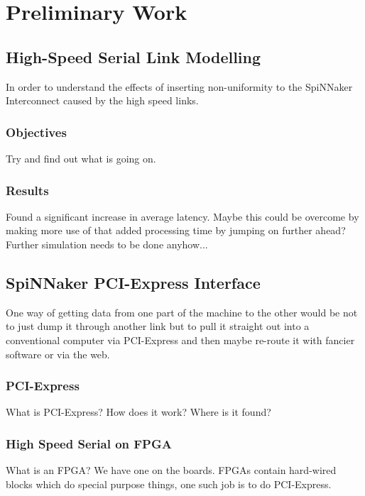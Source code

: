 \chapter{Preliminary Work}
	
	\section{High-Speed Serial Link Modelling}
		
		In order to understand the effects of inserting non-uniformity to the
		SpiNNaker Interconnect caused by the high speed links.
		
		\subsection{Objectives}
			Try and find out what is going on.
		
		\subsection{Results}
			Found a significant increase in average latency. Maybe this could be
			overcome by making more use of that added processing time by jumping on
			further ahead? Further simulation needs to be done anyhow...
	
	\section{SpiNNaker PCI-Express Interface}
		
		One way of getting data from one part of the machine to the other would be
		not to just dump it through another link but to pull it straight out into a
		conventional computer via PCI-Express and then maybe re-route it with
		fancier software or via the web.
		
		\subsection{PCI-Express}
			
			What is PCI-Express? How does it work? Where is it found?
		
		\subsection{High Speed Serial on FPGA}
			
			What is an FPGA? We have one on the boards. FPGAs contain hard-wired
			blocks which do special purpose things, one such job is to do PCI-Express.
	
